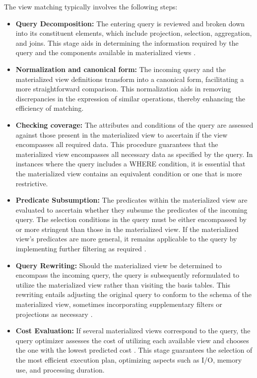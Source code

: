  The view matching typically involves the following steps:
  \begin{itemize}
      \item \textbf{Query Decomposition:} The entering query is reviewed and broken down into its constituent elements, which include projection, selection, aggregation, and joins. This stage aids in determining the information required by the query and the components available in materialized views \cite{theodoratos2000decomposition}.

      \item \textbf{Normalization and canonical form:} The incoming query and the materialized view definitions transform into a canonical form, facilitating a more straightforward comparison. This normalization aids in removing discrepancies in the expression of similar operations, thereby enhancing the efficiency of matching.

     \item \textbf{Checking coverage:} The attributes and conditions of the query are assessed against those present in the materialized view to ascertain if the view encompasses all required data. This procedure guarantees that the materialized view encompasses all necessary data as specified by the query. In instances where the query includes a WHERE condition, it is essential that the materialized view contains an equivalent condition or one that is more restrictive.
     
      \item \textbf{Predicate Subsumption:} The predicates within the materialized view are evaluated to ascertain whether they subsume the predicates of the incoming query. The selection conditions in the query must be either encompassed by or more stringent than those in the materialized view. If the materialized view's predicates are more general, it remains applicable to the query by implementing further filtering as required \cite{adali1996query}.

      \item \textbf{Query Rewriting:} Should the materialized view be determined to encompass the incoming query, the query is subsequently reformulated to utilize the materialized view rather than visiting the basis tables. This rewriting entails adjusting the original query to conform to the schema of the materialized view, sometimes incorporating supplementary filters or projections as necessary \cite{haldar2001query}.

         \item \textbf{Cost Evaluation:} If several materialized views correspond to the query, the query optimizer assesses the cost of utilizing each available view and chooses the one with the lowest predicted cost \cite{hulgeri2001cost}.
This stage guarantees the selection of the most efficient execution plan, optimizing aspects such as I/O, memory use, and processing duration.

  \end{itemize}
  
